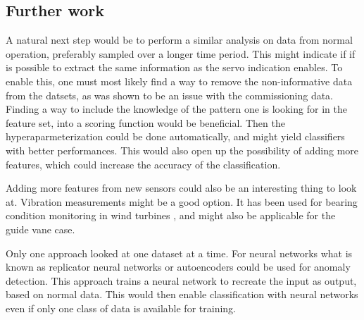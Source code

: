     
\subsection{Further work}
    A natural next step would be to perform a similar analysis on data from normal operation, preferably sampled over a longer time period. This might indicate if if is possible to extract the same information as the servo indication enables. To enable this, one must most likely find a way to remove the non-informative data from the datsets, as was shown to be an issue with the commissioning data. Finding a way to include the knowledge of the pattern one is looking for in the feature set, into a scoring function would be beneficial. Then the hyperaparmeterization could be done automatically, and might yield classifiers with better performances. This would also open up the possibility of adding more features, which could increase the accuracy of the classification.  


    Adding more features from new sensors could also be an interesting thing to look at.  Vibration measurements might be a good option. It has been used for bearing condition monitoring in wind turbines \cite{Dias2016}, and might also be applicable for the guide vane case. 
    
    
    Only one approach looked at one dataset at a time. For neural networks what is known as replicator neural networks or autoencoders could be used for anomaly detection. This approach trains a neural network to recreate the input as output, based on normal data. This would then enable classification with neural networks even if only one class of data is available for training. 
    
    